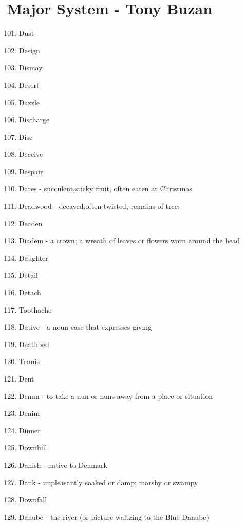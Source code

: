 
\chapter*{Major System - Tony Buzan}



    \begin{enumerate}
        \setcounter{enumi}{100}
        \item Dust
        \item Design
        \item Dismay
        \item Desert
        \item Dazzle
        \item Discharge
        \item Disc
        \item Deceive
        \item Despair
        \item Dates - succulent,sticky fruit, often eaten at Christmas
        \item Deadwood - decayed,often twisted, remains of trees
        \item Deaden
        \item Diadem - a crown; a wreath of leaves or flowers worn around the head
        \item Daughter
        \item Detail
        \item Detach
        \item Toothache
        \item Dative - a noun case that expresses giving
        \item Deathbed
        \item Tennis
        \item Dent
        \item Denun - to take a nun or nuns away from a place or situation
        \item Denim
        \item Dinner
        \item Downhill
        \item Danish - native to Denmark
        \item Dank - unpleasantly soaked or damp; marshy or swampy
        \item Downfall
        \item Danube - the river (or picture waltzing to the Blue Danube)

\end{enumerate}

